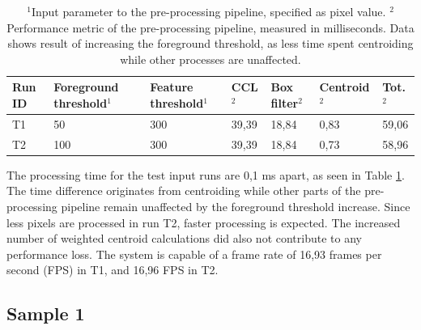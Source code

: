 \documentclass[12pt]{report}
\begin{document}
\begin{table}[!h]
    \centering
    \begin{tabular}{|p{0.8cm}|p{2.5cm}|p{2cm}||p{1.25cm}|p{1.25cm}|p{1.9cm}|p{1cm}|}
        \hline
        \textbf{Run ID}&\textbf{Foreground threshold$^{1}$}&\textbf{Feature threshold$^{1}$}&\textbf{CCL$^{2}$}&\textbf{Box filter$^{2}$}&\textbf{Centroid$^{2}$}&\textbf{Tot.$^{2}$}\\
        \hline
        \hline
        T1&50&300&39,39&18,84&0,83&59,06\\
        \hline
        T2&100&300&39,39&18,84&0,73&58,96\\
        \hline
    \end{tabular}
    \caption{$^{1}$Input parameter to the pre-processing pipeline, specified as pixel value. $^{2}$Performance metric of the pre-processing pipeline, measured in milliseconds. Data shows result of increasing the foreground threshold, as less time spent centroiding while other processes are unaffected.}
    \label{table:t_res}
\end{table}

The processing time for the test input runs are 0,1 ms apart, as seen in Table \ref{table:t_res}. The time difference originates from centroiding while other parts of the pre-processing pipeline remain unaffected by the foreground threshold increase. Since less pixels are processed in run T2, faster processing is expected. The increased number of weighted centroid calculations did also not contribute to any performance loss. The system is capable of a frame rate of 16,93 frames per second (FPS) in T1, and 16,96 FPS in T2. 

\subsection*{Sample 1}
\end{document}
